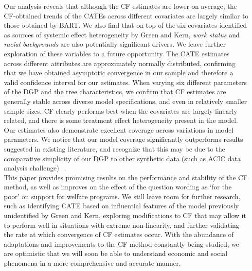 \documentclass[12pt]{article}
\begin{document}
Our analysis reveals that although the CF estimates are lower on average, the CF-obtained trends of the CATEs across different covariates are largely similar to those obtained by BART. We also find that on top of the six covariates identified as sources of systemic effect heterogeneity by Green and Kern, \textit{work status} and \textit{racial backgrounds} are also potentially significant drivers. We leave further exploration of these variables to a future opportunity. The CATE estimates across different attributes are approximately normally distributed, confirming that we have obtained asymptotic convergence in our sample and therefore a valid confidence interval for our estimates. When varying six different parameters of the DGP and the tree characteristics, we confirm that CF estimates are generally stable across diverse model specifications, and even in relatively smaller sample sizes. CF clearly performs best when the covariates are largely linearly related, and there is some treatment effect heterogeneity present in the model. Our estimates also demonstrate excellent coverage across variations in model parameters. We notice that our model coverage significantly outperforms results suggested in existing literature, and recognize that this may be due to the comparative simplicity of our DGP to other synthetic data (such as ACIC data analysis challenge) ~\cite{dorieACIC}. \\

This paper provides promising results on the performance and stability of the CF method, as well as improves on the effect of the question wording as `for the poor' on support for welfare programs. We still leave room for further research, such as identifying CATE based on influential features of the model previously unidentified by Green and Kern, exploring modifications to CF that may allow it to perform well in situations with extreme non-linearity,  and further validating the rate at which convergence of CF estimates occur. With the abundance of adaptations and improvements to the CF method constantly being studied, we are optimistic that we will soon be able to understand economic and social phenomena in a more comprehensive and accurate manner. 
\end{document}
